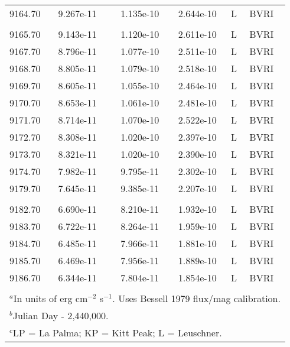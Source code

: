 \begin{center}
\begin{tabular} {l l c c l l}
   9164.70  &  9.267e-11  &  1.135e-10  &  2.644e-10 &  L & BVRI  \\
 \\
   9165.70  &  9.143e-11  &  1.120e-10  &  2.611e-10 &  L & BVRI  \\
   9167.70  &  8.796e-11  &  1.077e-10  &  2.511e-10 &  L & BVRI  \\
   9168.70  &  8.805e-11  &  1.079e-10  &  2.518e-10 &  L & BVRI  \\
   9169.70  &  8.605e-11  &  1.055e-10  &  2.464e-10 &  L & BVRI  \\
   9170.70  &  8.653e-11  &  1.061e-10  &  2.481e-10 &  L & BVRI  \\
   9171.70  &  8.714e-11  &  1.070e-10  &  2.522e-10 &  L & BVRI  \\
   9172.70  &  8.308e-11  &  1.020e-10  &  2.397e-10 &  L & BVRI  \\
   9173.70  &  8.321e-11  &  1.020e-10  &  2.390e-10 &  L & BVRI  \\
   9174.70  &  7.982e-11  &  9.795e-11  &  2.302e-10 &  L & BVRI  \\
   9179.70  &  7.645e-11  &  9.385e-11  &  2.207e-10 &  L & BVRI  \\
 \\
   9182.70  &  6.690e-11  &  8.210e-11  &  1.932e-10 &  L & BVRI  \\
   9183.70  &  6.722e-11  &  8.264e-11  &  1.959e-10 &  L & BVRI  \\
   9184.70  &  6.485e-11  &  7.966e-11  &  1.881e-10 &  L & BVRI  \\
   9185.70  &  6.469e-11  &  7.956e-11  &  1.889e-10 &  L & BVRI  \\
   9186.70  &  6.344e-11  &  7.804e-11  &  1.854e-10 &  L & BVRI  \\ \hline \hline
 \\ 
\multicolumn{6}{l}{$^a$In units of erg cm$^{-2}$ s$^{-1}$.  Uses Bessell 1979 flux/mag calibration.} \\
\multicolumn{6}{l}{$^b$Julian Day - 2,440,000.} \\
\multicolumn{6}{l}{$^c$LP = La Palma; KP = Kitt Peak; L = Leuschner.} \\
\end{tabular}
\end{center}

\vfill
\eject
 
